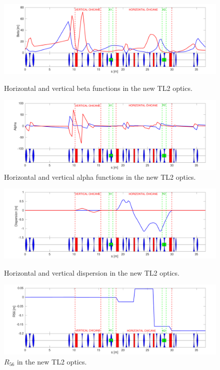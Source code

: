 \begin{landscape}
\begin{figure}
  \centering
  \includegraphics[width=0.85\hsize]{Figures/optics/pffOpticsBeta}
  \caption{Horizontal and vertical beta functions in the new TL2 optics.}
  \label{f:pffOpticsBeta}
  \centering
  \includegraphics[width=0.85\hsize]{Figures/optics/pffOpticsAlpha}
  \caption{Horizontal and vertical alpha functions in the new TL2 optics.}
  \label{f:pffOpticsAlpha}
\end{figure}

\begin{figure}
  \centering
   \includegraphics[width=0.85\hsize]{Figures/optics/pffOpticsDisp}
  \caption{Horizontal and vertical dispersion in the new TL2 optics.}
  \label{f:pffOpticsDisp}
  \includegraphics[width=0.85\hsize]{Figures/optics/pffOpticsR56}
  \caption{\(R_{56}\) in the new TL2 optics.}
  \label{f:pffOpticsR56}
\end{figure}


\end{landscape}
